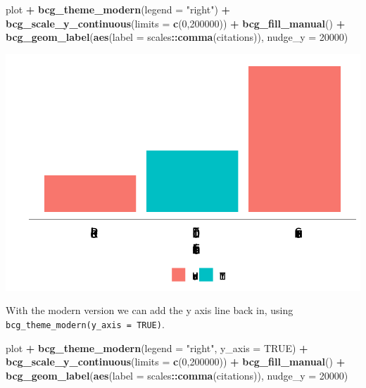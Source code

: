 \documentclass[
]{article}
\newenvironment{Shaded}{\begin{snugshade}}{\end{snugshade}}
\newcommand{\DataTypeTok}[1]{\textcolor[rgb]{0.13,0.29,0.53}{#1}}
\newcommand{\DecValTok}[1]{\textcolor[rgb]{0.00,0.00,0.81}{#1}}
\newcommand{\KeywordTok}[1]{\textcolor[rgb]{0.13,0.29,0.53}{\textbf{#1}}}
\newcommand{\NormalTok}[1]{#1}
\newcommand{\OperatorTok}[1]{\textcolor[rgb]{0.81,0.36,0.00}{\textbf{#1}}}
\newcommand{\OtherTok}[1]{\textcolor[rgb]{0.56,0.35,0.01}{#1}}
\newcommand{\StringTok}[1]{\textcolor[rgb]{0.31,0.60,0.02}{#1}}
\begin{document}
\begin{Shaded}
\begin{Highlighting}[]
\NormalTok{plot }\OperatorTok{+}
\StringTok{  }\KeywordTok{bcg_theme_modern}\NormalTok{(}\DataTypeTok{legend =} \StringTok{"right"}\NormalTok{) }\OperatorTok{+}
\StringTok{  }\KeywordTok{bcg_scale_y_continuous}\NormalTok{(}\DataTypeTok{limits =} \KeywordTok{c}\NormalTok{(}\DecValTok{0}\NormalTok{,}\DecValTok{200000}\NormalTok{)) }\OperatorTok{+}
\StringTok{  }\KeywordTok{bcg_fill_manual}\NormalTok{() }\OperatorTok{+}
\StringTok{  }\KeywordTok{bcg_geom_label}\NormalTok{(}\KeywordTok{aes}\NormalTok{(}\DataTypeTok{label =}\NormalTok{ scales}\OperatorTok{::}\KeywordTok{comma}\NormalTok{(citations)), }\DataTypeTok{nudge_y =} \DecValTok{20000}\NormalTok{)}
\end{Highlighting}
\end{Shaded}

\includegraphics{using_bcggtheme_files/figure-latex/unnamed-chunk-8-1.pdf}

With the modern version we can add the y axis line back in, using
\texttt{bcg\_theme\_modern(y\_axis\ =\ TRUE)}.

\begin{Shaded}
\begin{Highlighting}[]
\NormalTok{plot }\OperatorTok{+}
\StringTok{  }\KeywordTok{bcg_theme_modern}\NormalTok{(}\DataTypeTok{legend =} \StringTok{"right"}\NormalTok{, }\DataTypeTok{y_axis =} \OtherTok{TRUE}\NormalTok{) }\OperatorTok{+}
\StringTok{  }\KeywordTok{bcg_scale_y_continuous}\NormalTok{(}\DataTypeTok{limits =} \KeywordTok{c}\NormalTok{(}\DecValTok{0}\NormalTok{,}\DecValTok{200000}\NormalTok{)) }\OperatorTok{+}
\StringTok{  }\KeywordTok{bcg_fill_manual}\NormalTok{() }\OperatorTok{+}
\StringTok{  }\KeywordTok{bcg_geom_label}\NormalTok{(}\KeywordTok{aes}\NormalTok{(}\DataTypeTok{label =}\NormalTok{ scales}\OperatorTok{::}\KeywordTok{comma}\NormalTok{(citations)), }\DataTypeTok{nudge_y =} \DecValTok{20000}\NormalTok{)}
\end{Highlighting}
\end{Shaded}
\end{document}
